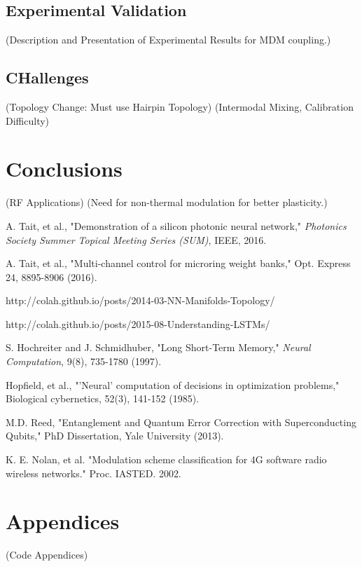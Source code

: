 \documentclass[12pt]{article}
\begin{document}
\subsection{Experimental Validation}
(Description and Presentation of Experimental Results for MDM coupling.)
\subsection{CHallenges}
(Topology Change: Must use Hairpin Topology)
(Intermodal Mixing, Calibration Difficulty)

\section{Conclusions}
(RF Applications)
(Need for non-thermal modulation for better plasticity.)

\newpage

\begin{thebibliography}{100}

 A. Tait, et al., "Demonstration of a silicon photonic neural network," {\em Photonics Society Summer Topical Meeting Series (SUM)}, IEEE, 2016.

 A. Tait, et al., "Multi-channel control for microring
weight banks," Opt. Express 24, 8895-8906 (2016).

 http://colah.github.io/posts/2014-03-NN-Manifolds-Topology/

 http://colah.github.io/posts/2015-08-Understanding-LSTMs/

 S. Hochreiter and J. Schmidhuber, "Long Short-Term Memory," {\em Neural Computation}, 9(8), 735-1780 (1997).

 Hopfield, et al., "'Neural' computation of decisions in optimization problems," Biological cybernetics, 52(3), 141-152 (1985).

 M.D. Reed, "Entanglement and Quantum Error Correction with
Superconducting Qubits," PhD Dissertation, Yale University (2013).

 K. E. Nolan, et al. "Modulation scheme classification for 4G software radio wireless networks." Proc. IASTED. 2002.

\end{thebibliography}
\newpage
\section{Appendices}
(Code Appendices)
\end{document}
